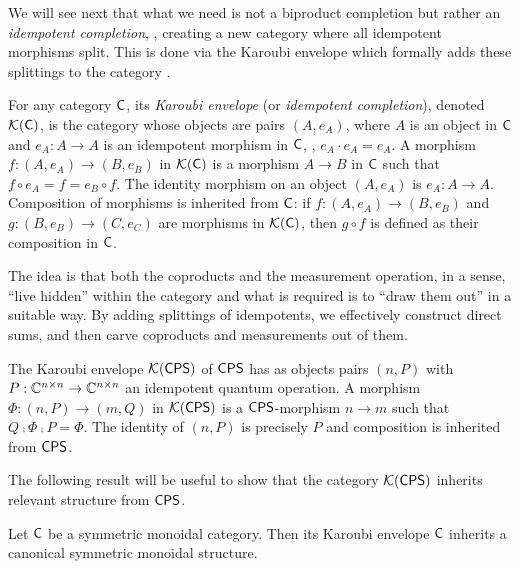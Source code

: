 We will see next that what we need is not a biproduct completion but rather an \emph{idempotent completion}, \ie, creating a new category where all idempotent morphisms split. This is done via the Karoubi envelope which formally adds these splittings to the category \cite{borceuxHandbookCategoricalAlgebra1994}.

\begin{definition}
  For any category $\mathsf{C}$, its \emph{Karoubi envelope} (or \emph{idempotent completion}), denoted $\mathcal{K}(\mathsf{C})$, is the category whose objects
 are pairs $(A, e_A)$, where $A$ is an object in $\mathsf{C}$ and $e_A \colon A \to A$ is an idempotent morphism in $\mathsf{C}$, \ie, $e_A \cdot e_A = e_A$.
A morphism $f \colon (A, e_A) \to (B, e_B)$ in $\mathcal{K}(\mathsf{C})$ is a morphism $ A \to B$ in $\mathsf{C}$ such that $f \circ e_A = f = e_B \circ f$.
The identity morphism on an object $(A, e_A)$ is $e_A \colon A \to A$. Composition of morphisms is inherited from $\mathsf{C}$: if $f \colon (A, e_A) \to (B, e_B)$ and $g \colon (B, e_B) \to (C, e_C)$ are morphisms in $\mathcal{K}(\mathsf{C})$, then $g \circ f$ is defined as their composition in $\mathsf{C}$.
\end{definition}
The idea is that both the coproducts and the measurement operation, in a sense, ``live hidden'' within the category and what is required is to ``draw them out'' in a suitable way. By adding splittings of idempotents, we effectively construct direct sums,  and then carve coproducts and measurements out of them.
\begin{definition}
        The Karoubi envelope $\mathcal{K}{(\mathsf{CPS})}$ of $\mathsf{CPS}$ has as objects pairs $(n,
        P)$ with $P : \mathbb{C}^{n \times n} \to \mathbb{C}^{n \times n}$ an
        idempotent quantum operation. A morphism $\Phi : (n,
        P) \to (m,Q)$ in $\mathcal{K}{(\mathsf{CPS})}$ is a $\mathsf{CPS}$-morphism $n \to m$  such that
        $Q \comp \Phi \comp P = \Phi$. The identity of $(n ,P)$ is precisely
        $P$ and composition is inherited from $\mathsf{CPS}$.
\end{definition}




The following result will be useful to show that the category $\mathcal{K}{(\mathsf{CPS})}$ inherits relevant structure from $\mathsf{CPS}$. 

\begin{proposition} \cite[Proposition 6.5.9]{borceuxHandbookCategoricalAlgebra1994a} \label{prop:kar_monoidal}
  Let $\mathsf{C}$ be a symmetric monoidal category. Then its Karoubi envelope $\mathsf{C}$ inherits a canonical symmetric monoidal structure.
\end{proposition}

